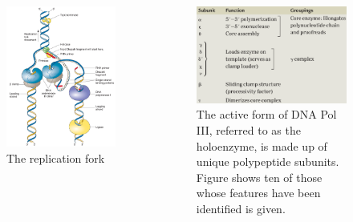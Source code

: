\documentclass[11pt,ignorenonframetext,aspectratio=169]{beamer}
\newcommand{\bcolumns}{\begin{columns}[T, onlytextwidth]}
\newcommand{\ecolumns}{\end{columns}}
\begin{document}
\begin{frame}{}
\protect\hypertarget{section-8}{}
\bcolumns
{}

\begin{figure}

{\centering \includegraphics[width=0.76\linewidth]{../images/dna_replication_process} 

}

\caption{The replication fork}\label{fig:dna-replication-process}
\end{figure}


\begin{figure}
\includegraphics[width=0.9\linewidth]{../images/DNA-pol-III-holoenzyme} \caption{The active form of DNA Pol III, referred to as the holoenzyme, is made up of unique polypeptide subunits. Figure shows ten of those whose features have been identified is given.}\label{fig:dna-pol-holoenzyme}
\end{figure}

\ecolumns
\end{frame}
\end{document}
